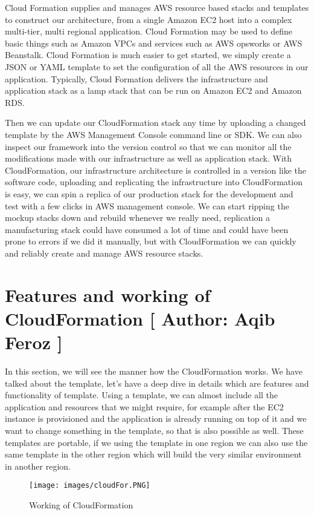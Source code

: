 Cloud Formation supplies and manages AWS resource based stacks and templates to construct our architecture, from a single Amazon EC2 host into a complex multi-tier, multi regional application. Cloud Formation may be used to define basic things such as Amazon VPCs and services such as AWS opsworks or AWS Beanstalk. Cloud Formation is much easier to get started, we simply create a JSON or YAML template to set the configuration of all the AWS resources in our application. Typically, Cloud Formation delivers the infrastructure and application stack as a lamp stack that can be run on Amazon EC2 and Amazon RDS.

Then we can update our CloudFormation stack any time by uploading a changed template by the AWS Management Console command line or SDK. We can also inspect our framework into the version control so that we can monitor all the modifications made with our infrastructure as well as application stack. With CloudFormation, our infrastructure architecture is controlled in a version like the software code, uploading and replicating the infrastructure into CloudFormation is easy, we can spin a replica of our production stack for the development and test with a few clicks in AWS management console. We can start ripping the mockup stacks down and rebuild whenever we really need, replication a manufacturing stack could have consumed a lot of time and could have been prone to errors if we did it manually, but with CloudFormation we can quickly and reliably create and manage AWS resource stacks.

\section{Features and working of CloudFormation [ Author: Aqib Feroz ]}
In this section, we will see the manner how the CloudFormation works. We have talked about the template, let’s have a deep dive in details which are features and functionality of template. Using a template, we can almost include all the application and resources that we might require, for example after the EC2 instance is provisioned and the application is already running on top of it and we want to change something in the template, so that is also possible as well. These templates are portable, if we using the template in one region we can also use the same template in the other region which will build the very similar environment in another region.

\begin{figure}[h]
    \centering
    \texttt{[image: images/cloudFor.PNG]}
    \caption{Working of CloudFormation}
    \label{fig:my_label}
\end{figure}

